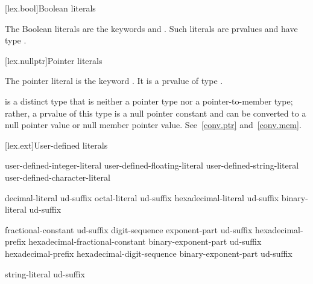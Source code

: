 [lex.bool]{Boolean literals}

%
\begin{bnf}
\br
    \br
\end{bnf}

\pnum
{}%
The Boolean literals are the keywords  and .
Such literals are prvalues and have type .

[lex.nullptr]{Pointer literals}

%
\begin{bnf}
\br
\end{bnf}

\pnum
The pointer literal is the keyword . It is a prvalue of type
.
\begin{note}
 is a distinct type that is neither a pointer type nor a pointer-to-member type;
rather, a prvalue of this type is a null pointer constant and can be
converted to a null pointer value or null member pointer value. See~\ref{conv.ptr}
and~\ref{conv.mem}.
\end{note}

[lex.ext]{User-defined literals}

%
\begin{bnf}
\br
    user-defined-integer-literal\br
    user-defined-floating-literal\br
    user-defined-string-literal\br
    user-defined-character-literal
\end{bnf}

\begin{bnf}
\br
    decimal-literal ud-suffix\br
    octal-literal ud-suffix\br
    hexadecimal-literal ud-suffix\br
    binary-literal ud-suffix
\end{bnf}

\begin{bnf}
\br
    fractional-constant  ud-suffix\br
    digit-sequence exponent-part ud-suffix\br
    hexadecimal-prefix hexadecimal-fractional-constant binary-exponent-part ud-suffix\br
    hexadecimal-prefix hexadecimal-digit-sequence binary-exponent-part ud-suffix
\end{bnf}

\begin{bnf}
\br
    string-literal ud-suffix
\end{bnf}

